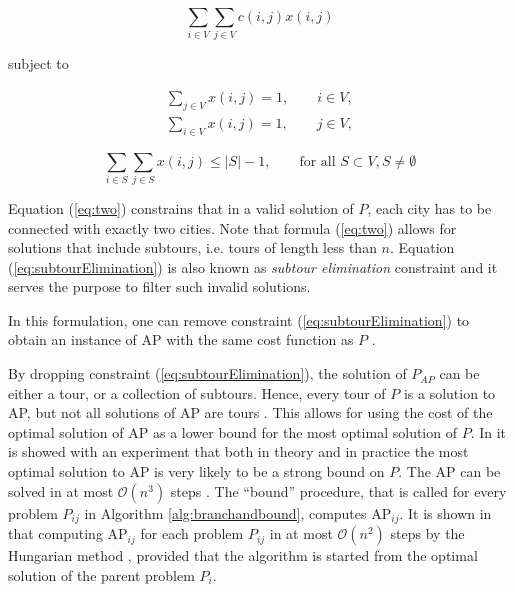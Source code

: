 \documentclass{article}
\theoremstyle{definition}
\begin{document}
\begin{equation}
\label{eq:one}
\sum_{i\in V}\sum_{j\in V} c(i,j)x(i,j)
\end{equation}

subject to

\begin{equation}
\label{eq:two}
\begin{split}
  \sum_{j \in V} x(i,j) = 1, \qquad i \in V,\\
  \sum_{i \in V} x(i,j) = 1, \qquad j \in V,
\end{split}
\end{equation}

\begin{equation}
\label{eq:subtourElimination}
\sum_{i\in S}\sum_{j\in S} x(i,j) \leq |S| - 1, \qquad \textrm{for all } S \subset V, S \neq \emptyset
\end{equation}

Equation (\ref{eq:two}) constrains that in a valid solution of $P$, each city has to be connected with exactly two cities. Note that formula (\ref{eq:two}) allows for solutions that include subtours, i.e. tours of length less than $n$. Equation (\ref{eq:subtourElimination}) is also known as \textit{subtour elimination} constraint and it serves the purpose to filter such invalid solutions.

In this formulation, one can remove constraint (\ref{eq:subtourElimination}) to obtain an instance of AP with the same cost function as $P$ \citep{Little63,Eastman58,Bellmore71}.

By dropping constraint (\ref{eq:subtourElimination}), the solution of $P_{AP}$ can be either a tour, or a collection of subtours. Hence, every tour of $P$ is a solution to AP, but not all solutions of AP are tours \citep{Bellmore71}. This allows for using the cost of the optimal solution of AP as a lower bound for the most optimal solution of $P$. In \cite{tspbible} it is showed with an experiment that both in theory and in practice the most optimal solution to AP is very likely to be a strong bound on $P$. The AP can be solved in at most $\mathcal{O}(n^{3})$ steps \citep{Kuhn55,Christofides75}. The ``bound'' procedure, that is called for every problem $P_{ij}$ in Algorithm \ref{alg:branchandbound}, computes AP$_{ij}$. It is shown in \cite{tspbible} that computing AP$_{ij}$ for each problem $P_{ij}$ in at most $\mathcal{O}(n^{2})$ steps by the Hungarian method \citep{Kuhn55}, provided that the algorithm is started from the optimal solution of the parent problem $P_{i}$.
\end{document}

